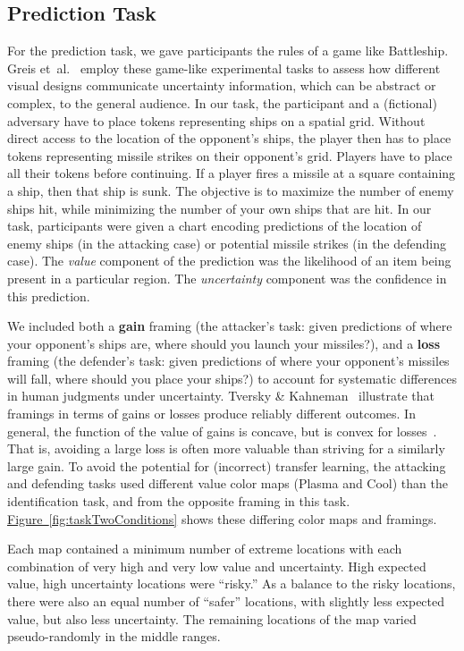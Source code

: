 \documentclass{vgtc}                          %
\newcommand{\figref}[1]{\hyperref[#1]{Figure~\ref*{#1}}}
\newcommand{\ea}{{et~al.}\xspace}
\begin{document}
\subsection{Prediction Task}

\taskTwoFig

For the prediction task, we gave participants the rules of a game like Battleship. Greis \ea~\cite{greis2016decision} employ these game-like experimental tasks to assess how different visual designs communicate uncertainty information, which can be abstract or complex, to the general audience. In our task, the participant and a (fictional) adversary have to place tokens representing ships on a spatial grid. Without direct access to the location of the opponent's ships, the player then has to place tokens representing missile strikes on their opponent's grid. Players have to place all their tokens before continuing. If a player fires a missile at a square containing a ship, then that ship is sunk. The objective is to maximize the number of enemy ships hit, while minimizing the number of your own ships that are hit. In our task, participants were given a chart encoding predictions of the location of enemy ships (in the attacking case) or potential missile strikes (in the defending case). The \emph{value} component of the prediction was the likelihood of an item being present in a particular region. The \emph{uncertainty} component was the confidence in this prediction.

We included both a \textbf{gain} framing (the attacker's task: given predictions of where your opponent's ships are, where should you launch your missiles?), and a \textbf{loss} framing (the defender's task: given predictions of where your opponent's missiles will fall, where should you place your ships?) to account for systematic differences in human judgments under uncertainty. Tversky \& Kahneman~\cite{tversky1985framing} illustrate that framings in terms of gains or losses produce reliably different outcomes. In general, the function of the value of gains is concave, but is convex for losses~\cite{kahneman1979prospect}. That is, avoiding a large loss is often more valuable than striving for a similarly large gain. To avoid the potential for (incorrect) transfer learning, the attacking and defending tasks used different value color maps (Plasma and Cool) than the identification task, and from the opposite framing in this task. \figref{fig:taskTwoConditions} shows these differing color maps and framings.

Each map contained a minimum number of extreme locations with each combination of very high and very low value and uncertainty. High expected value, high uncertainty locations were ``risky.'' As a balance to the risky locations, there were also an equal number of ``safer'' locations, with slightly less expected value, but also less uncertainty. The remaining locations of the map varied pseudo-randomly in the middle ranges.
\end{document}
